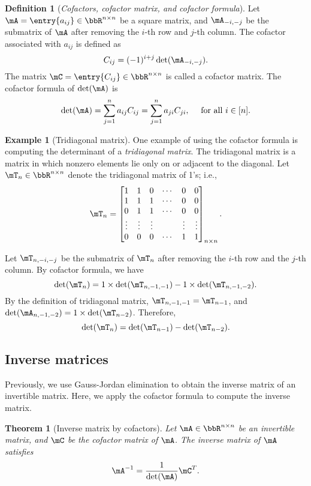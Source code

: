 \documentclass[11pt]{article}
\theoremstyle{plain}
\newtheorem{thm}{Theorem}[section]
\theoremstyle{definition}
\newtheorem{defn}{Definition}
\newtheorem{example}{Example}
\begin{document}
\begin{defn}[\textit{Cofactors, cofactor matrix, and cofactor formula}]
	Let $\mA=  \entry{a_{ij}} \in \bbR^{n \times n}$ be a square matrix, and $\mA_{-i,-j}$ be the submatrix of $\mA$ after removing the $i$-th row and $j$-th column. The cofactor associated with $a_{ij}$ is defined as \[C_{ij} = (-1)^{i+j}\det(\mA_{-i,-j}).\]
	The matrix $\mC = \entry{C_{ij}} \in \bbR^{n \times n}$ is called a cofactor matrix.  The cofactor formula of $\det(\mA)$ is
	\[ \det(\mA) = \sum_{j=1}^n a_{ij} C_{ij} = \sum_{j=1}^n a_{ji} C_{ji} ,\quad \text{ for all } i \in [n].  \]
\end{defn}

\begin{example}[Tridiagonal matrix]
	One example of using the cofactor formula is computing the determinant of a \textit{tridiagonal matrix}. The tridiagonal matrix is a matrix in which nonzero elements lie only on or adjacent to the diagonal. Let $\mT_n \in \bbR^{n \times n}$ denote the tridiagonal matrix of 1's; i.e.,
\begin{align}
	\mT_n = \begin{bmatrix}
		1 &1&0 &\cdots & 0 &0\\
		1&1&1&\cdots &0&0\\
		0&1&1&\cdots &0&0\\
		\vdots &\vdots &\vdots &&\vdots &\vdots \\
		0&0&0&\cdots&1&1
	\end{bmatrix}_{n \times n}.
\end{align} 

Let $\mT_{n, -i,-j}$ be the submatrix of  $\mT_n$ after removing the $i$-th row and the $j$-th column.   By cofactor formula, we have
\[  \det(\mT_n) = 1 \times \det(\mT_{n, -1,-1}) - 1 \times \det(\mT_{n,-1,-2}). \]
By the definition of tridiagonal matrix, $\mT_{n,-1,-1} = \mT_{n-1}$, and $\det( \mA_{n,-1,-2}) = 1 \times \det(\mT_{n-2}) $. Therefore, 
\[ \det(\mT_n) = \det(\mT_{n-1}) - \det(\mT_{n-2}).  \] 
\end{example}

\subsection{Inverse matrices}
Previously, we use Gauss-Jordan elimination to obtain the inverse matrix of an invertible matrix. Here, we apply the cofactor formula to compute the inverse matrix.

\begin{thm}[Inverse matrix by cofactors]\label{thm:inver}
Let $\mA \in \bbR^{n \times n}$ be an invertible matrix, and $\mC$ be the cofactor matrix of $\mA$. The inverse matrix of $\mA$ satisfies
\[  \mA^{-1} = \frac{1}{\det(\mA)} \mC^T. \]	
\end{thm}
\end{document}
